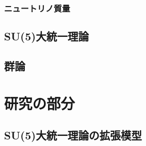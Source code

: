 \documentclass[uplatex,dvipdfmx,a4paper,titlepage]{jsbook}
\theoremstyle{plain}
\theoremstyle{definition}
\begin{document}
\section{ニュートリノ質量}


\chapter{SU(5)大統一理論}


\chapter{群論}



\part{研究の部分}

\chapter{SU(5)大統一理論の拡張模型}




\end{document}
